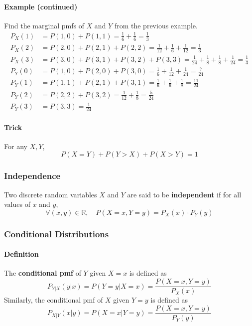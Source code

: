 \paragraph{Example (continued)}
Find the marginal pmfs of $X$ and $Y$ from the previous example.
\begin{align*}
    P_X(1) &= P(1,0) + P(1,1) = \frac{1}{6} + \frac{1}{6} = \frac{1}{3} \\
    P_X(2) &= P(2,0) + P(2,1) + P(2,2) = \frac{1}{12} + \frac{1}{6} + \frac{1}{12} = \frac{1}{3} \\
    P_X(3) &= P(3,0) + P(3,1) + P(3,2) + P(3,3) = \frac{1}{24} + \frac{1}{8} + \frac{1}{8} + \frac{1}{24} = \frac{1}{3}\\
    P_Y(0) &= P(1,0) + P(2,0) + P(3,0) = \frac{1}{6} + \frac{1}{12} + \frac{1}{24} = \frac{7}{24} \\
    P_Y(1) &= P(1,1) + P(2,1) + P(3,1) = \frac{1}{6} + \frac{1}{6} + \frac{1}{8} = \frac{11}{24} \\
    P_Y(2) &= P(2,2) + P(3,2) = \frac{1}{12} + \frac{1}{8} = \frac{5}{24} \\
    P_Y(3) &= P(3,3) = \frac{1}{24}
\end{align*}

\paragraph*{Trick}
For any $X, Y$,
\[
P(X=Y) + P(Y > X) + P(X > Y) = 1
\]

\hrulefill

\subsubsection*{Independence}
Two discrete random variables $X$ and $Y$ are said to be \textbf{independent} if for all values of $x$ and $y$,
\[
\forall (x,y) \in \mathbb{R}, \quad P(X=x, Y=y) = P_X(x) \cdot P_Y(y)
\]

\pagebreak

\subsubsection*{Conditional Distributions}
\paragraph*{Definition} The \textbf{conditional pmf} of $Y$ given $X=x$ is defined as
\[P_{Y|X}(y|x) = P(Y=y | X=x) = \frac{P(X=x, Y=y)}{P_X(x)}\]
Similarly, the conditional pmf of $X$ given $Y=y$ is defined as
\[P_{X|Y}(x|y) = P(X=x | Y=y) = \frac{P(X=x, Y=y)}{P_Y(y)}\]

